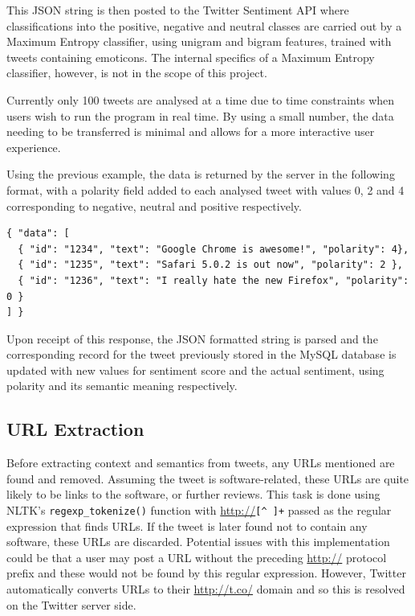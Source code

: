 This JSON string is then posted to the Twitter Sentiment API where classifications into the positive, negative and neutral classes are carried out by a Maximum Entropy classifier, using unigram and bigram features, trained with tweets containing emoticons. The internal specifics of a Maximum Entropy classifier, however, is not in the scope of this project.

Currently only 100 tweets are analysed at a time due to time constraints when users wish to run the program in real time. By using a small number, the data needing to be transferred is minimal and allows for a more interactive user experience.

Using the previous example, the data is returned by the server in the following format, with a polarity field added to each analysed tweet with values 0, 2 and 4 corresponding to negative, neutral and positive respectively.
\begin{verbatim}
{ "data": [ 
  { "id": "1234", "text": "Google Chrome is awesome!", "polarity": 4},
  { "id": "1235", "text": "Safari 5.0.2 is out now", "polarity": 2 },
  { "id": "1236", "text": "I really hate the new Firefox", "polarity": 0 } 
] }
\end{verbatim}

Upon receipt of this response, the JSON formatted string is parsed and the corresponding record for the tweet previously stored in the MySQL database is updated with new values for sentiment score and the actual sentiment, using polarity and its semantic meaning respectively.

\subsection{URL Extraction}
Before extracting context and semantics from tweets, any URLs mentioned are found and removed. Assuming the tweet is software-related, these URLs are quite likely to be links to the software, or further reviews. This task is done using NLTK's \texttt{regexp\_tokenize()} function with \url{http://}\verb/[^ ]+/ passed as the regular expression that finds URLs. If the tweet is later found not to contain any software, these URLs are discarded. Potential issues with this implementation could be that a user may post a URL without the preceding \url{http://} protocol prefix and these would not be found by this regular expression. However, Twitter automatically converts URLs to their \url{http://t.co/} domain and so this is resolved on the Twitter server side.

